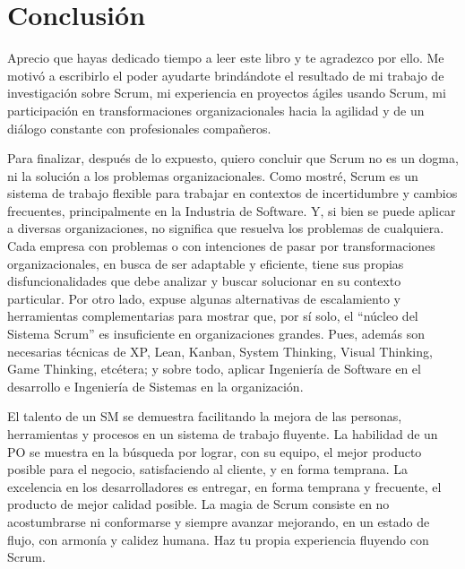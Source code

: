 \chapter{Conclusión}

Aprecio que hayas dedicado tiempo a leer este libro y te agradezco por ello. Me motivó a escribirlo el poder ayudarte brindándote el resultado de mi trabajo de investigación sobre Scrum, mi experiencia en proyectos ágiles usando Scrum, mi participación en transformaciones organizacionales hacia la agilidad y de un diálogo constante con profesionales compañeros. 

Para finalizar, después de lo expuesto, quiero concluir que Scrum no es un dogma, ni la solución a los problemas organizacionales. Como mostré, Scrum es un sistema de trabajo flexible para trabajar en contextos de incertidumbre y cambios frecuentes, principalmente en la Industria de Software. Y, si bien se puede aplicar a diversas organizaciones, no significa que resuelva los problemas de cualquiera. Cada empresa con problemas o con intenciones de pasar por transformaciones organizacionales, en busca de ser adaptable y eficiente, tiene sus propias disfuncionalidades que debe analizar y buscar solucionar en su contexto particular. Por otro lado, expuse algunas alternativas de escalamiento y herramientas complementarias para mostrar que, por sí solo, el “núcleo del Sistema Scrum” es insuficiente en organizaciones grandes. Pues, además son necesarias técnicas de XP, Lean, Kanban, System Thinking, Visual Thinking, Game Thinking, etcétera; y sobre todo, aplicar Ingeniería de Software en el desarrollo e Ingeniería de Sistemas en la organización.

El talento de un SM se demuestra facilitando la mejora de las personas, herramientas y procesos en un sistema de trabajo fluyente. La habilidad de un PO se muestra en la búsqueda por lograr, con su equipo, el mejor producto posible para el negocio, satisfaciendo al cliente, y en forma temprana. La excelencia en los desarrolladores es entregar, en forma temprana y frecuente, el producto de mejor calidad posible. La magia de Scrum consiste en no acostumbrarse ni conformarse y siempre avanzar mejorando, en un estado de flujo, con armonía y calidez humana. Haz tu propia experiencia fluyendo con Scrum.
